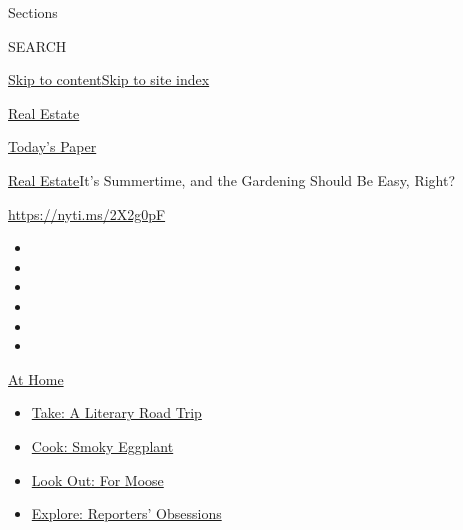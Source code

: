 Sections

SEARCH

\protect\hyperlink{site-content}{Skip to
content}\protect\hyperlink{site-index}{Skip to site index}

\href{https://www.nytimes3xbfgragh.onion/section/realestate}{Real
Estate}

\href{https://myaccount.nytimes3xbfgragh.onion/auth/login?response_type=cookie\&client_id=vi}{}

\href{https://www.nytimes3xbfgragh.onion/section/todayspaper}{Today's
Paper}

\href{/section/realestate}{Real Estate}\textbar{}It's Summertime, and
the Gardening Should Be Easy, Right?

\url{https://nyti.ms/2X2g0pF}

\begin{itemize}
\item
\item
\item
\item
\item
\item
\end{itemize}

\href{https://www.nytimes3xbfgragh.onion/spotlight/at-home?action=click\&pgtype=Article\&state=default\&region=TOP_BANNER\&context=at_home_menu}{At
Home}

\begin{itemize}
\tightlist
\item
  \href{https://www.nytimes3xbfgragh.onion/2020/07/28/books/time-for-a-literary-road-trip.html?action=click\&pgtype=Article\&state=default\&region=TOP_BANNER\&context=at_home_menu}{Take:
  A Literary Road Trip}
\item
  \href{https://www.nytimes3xbfgragh.onion/2020/07/29/magazine/bored-with-your-home-cooking-some-smoky-eggplant-will-fix-that.html?action=click\&pgtype=Article\&state=default\&region=TOP_BANNER\&context=at_home_menu}{Cook:
  Smoky Eggplant}
\item
  \href{https://www.nytimes3xbfgragh.onion/2020/07/27/travel/moose-michigan-isle-royale.html?action=click\&pgtype=Article\&state=default\&region=TOP_BANNER\&context=at_home_menu}{Look
  Out: For Moose}
\item
  \href{https://www.nytimes3xbfgragh.onion/interactive/2020/at-home/even-more-reporters-editors-diaries-lists-recommendations.html?action=click\&pgtype=Article\&state=default\&region=TOP_BANNER\&context=at_home_menu}{Explore:
  Reporters' Obsessions}
\end{itemize}


